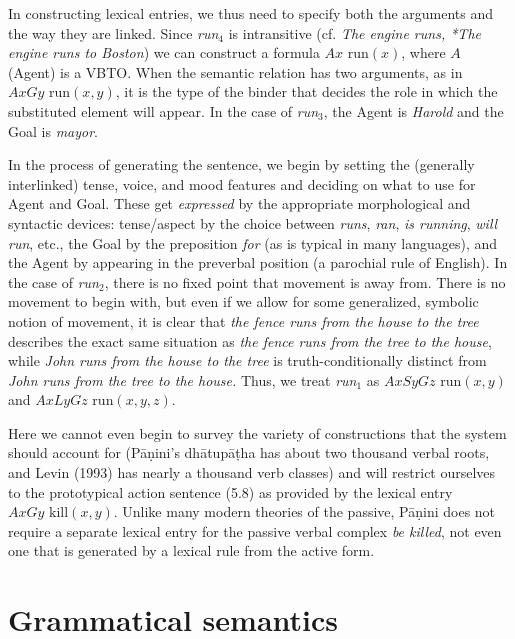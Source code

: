 \bigskip
\noindent
In constructing lexical entries, we thus need to specify both the arguments
and the way they are linked. Since {\it run$_4$} is intransitive (cf. {\it The
  engine runs, *The engine runs to Boston}) we can construct a formula $A x
\text{ run}(x)$, where $A$ (Agent) is a VBTO. When the semantic relation has
two arguments, as in $A x G y \text{ run}(x,y)$, it is the type of the binder
that decides the role in which the substituted element will appear. In the
case of {\it run$_3$}, the Agent is {\it Harold} and the Goal is {\it mayor}.

In the process of generating the sentence, we begin by setting the (generally
interlinked) tense, voice, and mood features and deciding on what to use for
Agent and Goal. These get {\it expressed} by the appropriate morphological and
syntactic devices: tense/aspect by the choice between {\it runs}, {\it ran},
{\it is running}, {\it will run}, etc., the Goal by the preposition {\it for}
(as is typical in many languages), and the Agent by appearing in the preverbal
position (a parochial rule of English). In the case of {\it run$_2$}, there is
no fixed point that movement is away from. There is no movement to begin with,
but even if we allow for some generalized, symbolic notion of movement, it is
clear that {\it the fence runs from the house to the tree} describes the exact
same situation as {\it the fence runs from the tree to the house}, while {\it
  John runs from the house to the tree} is truth-conditionally distinct from {\it John runs from the tree to the house.} Thus,
we treat {\it run$_1$} as $A x S y G z \text{ run}(x,y)$ and $A x L y G z
\text{ run}(x,y,z)$.

Here we cannot even begin to survey the variety of constructions that the
system should account for (P\={a}\d{n}ini's 
dh\={a}tup\={a}\d{t}ha has about
two thousand verbal roots, and Levin (1993) has nearly a thousand verb
classes) and will restrict ourselves to the prototypical action sentence 
(5.8) as provided by the lexical entry $A x G y \text{ kill}(x,y)$. Unlike 
many modern theories of the passive, P\={a}\d{n}ini does not require a 
separate lexical entry for the passive verbal complex {\it be killed},
not even one that is generated by a lexical rule from the active form. 

\section{Grammatical semantics}

